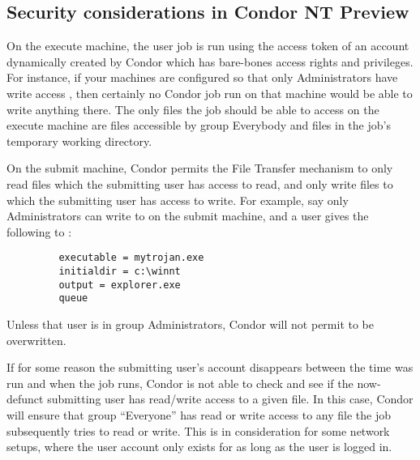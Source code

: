 \subsection{Security considerations in Condor NT Preview}

On the execute machine, the user job is run using the access token of an
account dynamically created by Condor which has bare-bones access rights and
privileges.  For instance, if your machines are configured so that only
Administrators have write access , then certainly no
Condor job run on that machine would be able to write anything there.  The
only files the job should be able to access on the execute machine are files
accessible by group Everybody and files in the job's temporary working
directory.

On the submit machine, Condor permits the File Transfer mechanism to only
read files which the submitting user has access to read, and only write
files to which the submitting user has access to write.  For example, say
only Administrators can write to  on the submit machine,
and a user gives the following to  :
\begin{verbatim}
         executable = mytrojan.exe
         initialdir = c:\winnt
         output = explorer.exe
         queue
\end{verbatim}
Unless that user is in group Administrators, Condor will not permit
 to be overwritten.  

If for some reason the submitting user's account disappears between the time
 was run and when the job runs, Condor is not able to check
and see if the now-defunct submitting user has read/write access to a given
file.  In this case, Condor will ensure that group ``Everyone'' has read or
write access to any file the job subsequently tries to read or write.  This
is in consideration for some network setups, where the user account only
exists for as long as the user is logged in.

